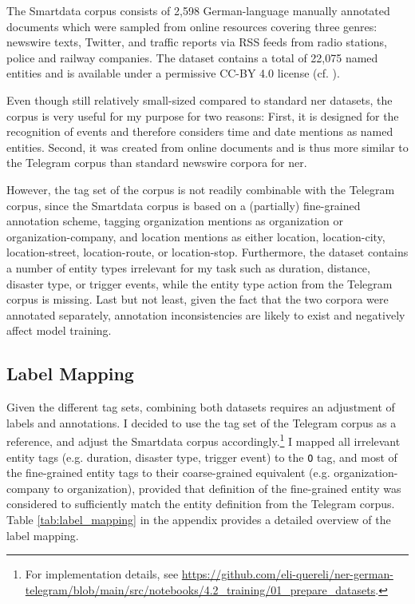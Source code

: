The Smartdata corpus consists of 2,598 German-language manually annotated documents which were sampled from online resources covering three genres: newswire texts, Twitter, and traffic reports via RSS feeds from radio stations, police and railway companies. The dataset contains a total of 22,075 named entities and is available under a permissive CC-BY 4.0 license (cf. \cite{schiersch_2018}). 

Even though still relatively small-sized compared to standard \gls{ner} datasets, the corpus is very useful for my purpose for two reasons: 
First, it is designed for the recognition of events and therefore considers time and date mentions as named entities. Second, it was created from online documents and is thus more similar to the Telegram corpus than standard newswire corpora for \gls{ner}. 

However, the tag set of the corpus is not readily combinable with the Telegram corpus, since the Smartdata corpus is based on a (partially) fine-grained annotation scheme, tagging organization mentions as organization or organization-company, and location mentions as either location, location-city, location-street, location-route, or location-stop. Furthermore, the dataset contains a number of entity types irrelevant for my task such as duration, distance, disaster type, or trigger events, while the entity type action from the Telegram corpus is missing. Last but not least, given the fact that the two corpora were annotated separately, annotation inconsistencies are likely to exist and negatively affect model training. 

\subsection{Label Mapping}
Given the different tag sets, combining both datasets requires an adjustment of labels and annotations. I decided to use the tag set of the Telegram corpus as a reference, and adjust the Smartdata corpus accordingly.\footnote{For implementation details, see \url{https://github.com/eli-quereli/ner-german-telegram/blob/main/src/notebooks/4.2_training/01_prepare_datasets}.}
I mapped all irrelevant entity tags (e.g. duration, disaster type, trigger event) to the \verb|O| tag, and most of the fine-grained entity tags to their coarse-grained equivalent (e.g. organization-company to organization), provided that definition of the fine-grained entity was considered to sufficiently match the entity definition from the Telegram corpus. Table \ref{tab:label_mapping} in the appendix provides a detailed overview of the label mapping.

